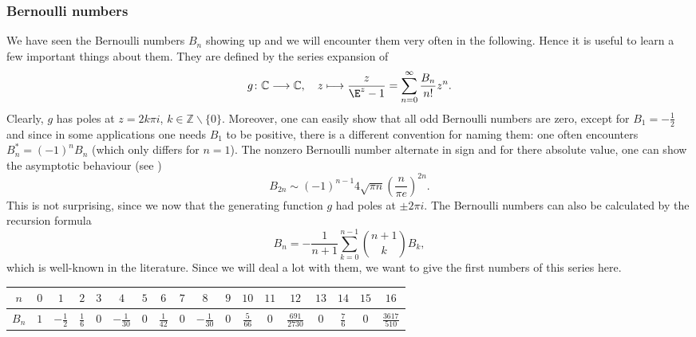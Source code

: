 \subsubsection{Bernoulli numbers}
We have seen the Bernoulli numbers $B_n$ showing up and we will encounter them 
very often in the following. Hence it is useful to learn a few important 
things about them. They are defined by the series expansion of
\begin{equation}
	\label{Alg:DefBernoulli}
	g \colon
	\mathbb{C}
	\longrightarrow
	\mathbb{C}
	, \quad
	z \longmapsto
	\frac{z}{\E^z - 1}
	=
	\sum\limits_{n=0}^{\infty}
	\frac{B_n}{n!}z^n.
\end{equation}
Clearly, $g$ has poles at $z = 2 k \pi i$, $k \in \mathbb{Z}\backslash \{0\}$.
Moreover, one can easily show that all odd Bernoulli numbers are zero, except 
for $B_1 = - \frac{1}{2}$ and since in some applications one needs $B_1$ to be 
positive, there is a different convention for naming them: one often 
encounters $B_n^* = (-1)^n B_n$ (which only differs for $n = 1$). The nonzero 
Bernoulli number alternate in sign and for there absolute value, one can show 
the asymptotic behaviour (see \cite{luschny.oeis})
\begin{equation*}
	B_{2n} 
	\sim 
	(-1)^{n-1} 
	4\sqrt{\pi n} 
	\left( \frac{n}{\pi e} \right)^{2n}.
\end{equation*}
This is not surprising, since we now that the generating function $g$ had 
poles at $\pm 2\pi i$. The Bernoulli numbers can also be calculated by the 
recursion formula
\begin{equation}
	B_n
	=
	- \frac{1}{n + 1}
	\sum\limits_{k = 0}^{n- 1}
	\binom{n + 1}{k}
	B_k,
\end{equation}
which is well-known in the literature. Since we will deal a lot with them, we 
want to give the first numbers of this series here.
\begin{center}
	\begin{tabular}
	{c||c|c|c|c|c|c|c|c|c|c|c|c|c|c|c|c|c}
		$n$ & $0$ & $1$ & 
		$2$ & $3$ & $4$ & 
		$5$ & $6$ & $7$ & 
		$8$ & $9$ & $10$ & 
		$11$ & $12$ & $13$ & 
		$14$ & $15$ & $16$
		\\
		\hline 
		$B_n$ & $1$ & $-\frac{1}{2}$ & 
		$\frac{1}{6}$ & $0$ & $-\frac{1}{30}$ & 
		$0$ & $\frac{1}{42}$ & $0$ & 
		$-\frac{1}{30}$ & $0$ & $\frac{5}{66}$ & 
		$0$ & $\frac{691}{2730}$ & $0$ & 
		$\frac{7}{6}$ & $0$ & $\frac{3617}{510}$
	\end{tabular} 
\end{center}


